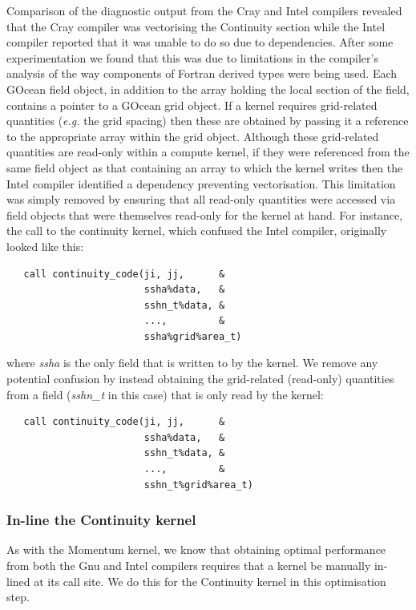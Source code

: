 \documentclass[gmd, manuscript]{copernicus}
\begin{document}
Comparison of the diagnostic output from the Cray and Intel
compilers revealed that the Cray compiler was vectorising the
Continuity section while the Intel compiler reported that it was
unable to do so due to dependencies. After some experimentation we
found that this was due to limitations in the compiler's analysis of
the way components of Fortran derived types were being used. Each
GOcean field object, in addition to the array holding the local
section of the field, contains a pointer to a GOcean grid object. If a
kernel requires grid-related quantities (\textit{e.g.} the grid spacing)
then these are obtained by passing it a reference to the appropriate
array within the grid object. Although these grid-related quantities
are read-only within a compute kernel, if they were referenced from the
same field object as that containing an array to which the kernel writes
then the Intel compiler identified a dependency preventing
vectorisation.  This limitation was simply removed by ensuring that
all read-only quantities were accessed via field objects that were
themselves read-only for the kernel at hand.  For instance, the call
to the continuity kernel, which confused the Intel compiler, originally
looked like this:
\begin{verbatim}
   call continuity_code(ji, jj,      &
                        ssha%data,   &
                        sshn_t%data, &
                        ...,         &
                        ssha%grid%area_t)
\end{verbatim}
where \textit{ssha} is the only field that is written to by the kernel.
We remove any potential confusion by instead obtaining the
grid-related (read-only) quantities from a field (\textit{sshn\_t} in
this case) that is only read by the kernel:
\begin{verbatim}
   call continuity_code(ji, jj,      &
                        ssha%data,   &
                        sshn_t%data, &
                        ...,         &
                        sshn_t%grid%area_t)
\end{verbatim}

\subsubsection{In-line the Continuity kernel}
\label{sec_cont_inline}

As with the Momentum kernel, we know that obtaining optimal
performance from both the Gnu and Intel compilers requires that a
kernel be manually in-lined at its call site. We do this for the
Continuity kernel in this optimisation step.
\end{document}
